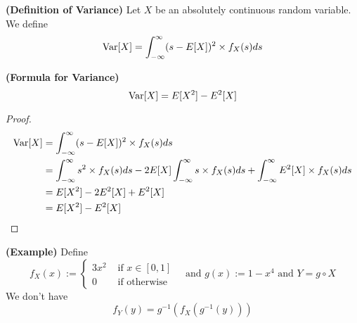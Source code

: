 \documentclass{report}
\begin{document}
\begin{definition}
\label{2.0.9}
\textbf{(Definition of Variance)} Let $X$ be an absolutely continuous random variable. We define
\begin{equation}
\text{Var} [X]=\int^\infty_{-\infty} (s-E[X])^2\times f_X(s)ds
\end{equation}
\end{definition}
\begin{theorem}
\label{2.0.10}
\textbf{(Formula for Variance)}
\begin{equation}
\text{Var} [X]=E[X^2]-E^2[X]
\end{equation}
\end{theorem}
\begin{proof}
\begin{align}
\text{Var} [X]&= \int^\infty_{-\infty}(s-E[X])^2 \times f_X(s)ds\\
&=\int^\infty_{-\infty} s^2 \times f_X(s) ds-2E[X]\int^\infty_{-\infty} s\times f_X(s)ds+\int_{-\infty}^\infty E^2[X]\times f_X(s)ds\\
&=E[X^2]-2E^2[X]+E^2[X]\\
&=E[X^2]-E^2[X]
\end{align}
\end{proof}
\begin{theorem}
\label{2.0.11}
\textbf{(Example)} Define
\begin{equation}
f_X(x):=\begin{cases}
  3x^2& \text{ if $x\in [0,1]$ }\\
  0& \text{ if otherwise }
\end{cases}\text{ and }g(x):=1-x^4\text{ and }Y=g\circ X
\end{equation}
We don't have
\begin{equation}
f_Y(y)=g^{-1}(f_X(g^{-1}(y)))
\end{equation}
\end{theorem}
\end{document}

